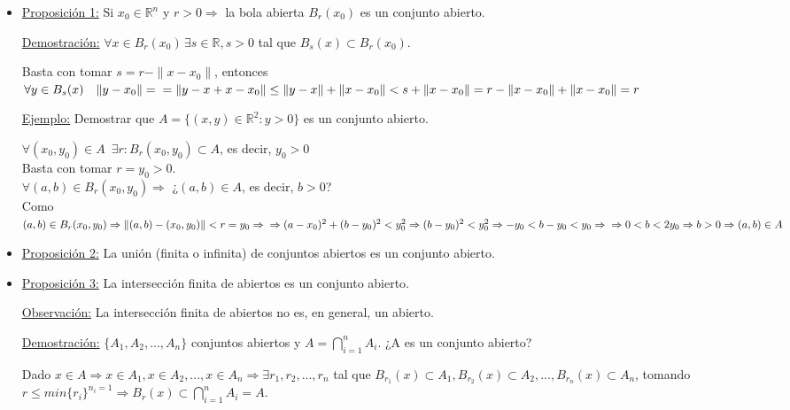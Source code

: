 \documentclass[12pt, titlepage]{article}
\newcommand{\R}{\mathbb{R}}
\newcommand{\spac}{\, \, \,}
\begin{document}
\begin{itemize}

\item \underline{Proposición 1:} Si $x_0 \in \mathbb{R}^n$ y $r>0 \Rightarrow$ la bola abierta $B_r(x_0)$ es un conjunto abierto.

\quad\underline{Demostración:} $\forall x \in B_r(x_0) \, \exists s \in \R , s>0$ tal que $B_s(x) \subset B_r(x_0)$.

Basta con tomar $s = r - \|x-x_0\|$, entonces $\forall y \in B_s(x) \quad \|y - x_0\| = \\
 = \|y -x +x -x_0\| \leq \|y-x\| + \|x - x_0\| < s + \|x - x_0\| = r - \|x - x_0\| + \|x - x_0\| = r$
\vspace{2mm}

\quad\underline{Ejemplo:} Demostrar que $A = \{ (x, y) \in \R^2 : y>0\}$ es un conjunto abierto.

$\forall (x_0, y_0) \in A \spac \exists r : B_r(x_0, y_0) \subset A$, es decir, $y_0 > 0$\\
Basta con tomar $r = y_0 > 0$.\\
$\forall (a, b) \in B_r(x_0, y_0) \Rightarrow$ ¿$(a, b) \in A$, es decir, $b>0$?\\
Como $ (a, b) \in B_r(x_0, y_0) \Rightarrow \|(a, b) - (x_0, y_0)\| < r = y_0 \Rightarrow \\
\Rightarrow (a - x_0)^2 + (b - y_0)^2 < y_0^2 \Rightarrow (b - y_0)^2 < y_0 ^2 \Rightarrow -y_0 < b-y_0 < y_0 \Rightarrow \\
 \Rightarrow 0< b < 2 y_0 \Rightarrow b > 0 \Rightarrow (a, b) \in A$

\item \underline{Proposición 2:} La unión (finita o infinita) de conjuntos abiertos es un conjunto abierto.

\item \underline{Proposición 3:} La intersección finita de abiertos es un conjunto abierto.\vspace{1mm}

\noindent *\underline{Observación:} La intersección finita de abiertos no es, en general, un abierto.

\underline{Demostración:} $\{A_1, A_2,..., A_n\}$ conjuntos abiertos y $A = \displaystyle \bigcap_{i = 1}^n A_i$.  ¿A es un conjunto abierto? 

Dado $x \in A \Rightarrow x \in A_1, x \in A_2,..., x \in A_n \Rightarrow \exists r_1, r_2,..., r_n$ tal que $ B_{r_1}(x) \subset  A_1, B_{r_2}(x) \subset A_2,..., B_{r_n}(x) \subset A_n$, tomando $r \leq min \{r_i\}^{n_i=1} \Rightarrow B_r(x) \subset \displaystyle \bigcap_{i = 1}^n A_i = A$.

\end{itemize}
\end{document}

